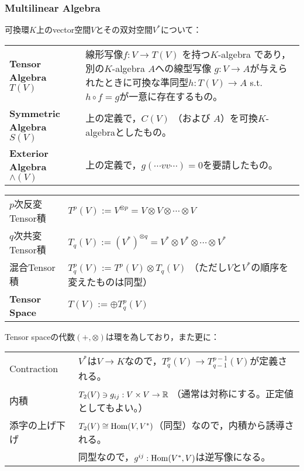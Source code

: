 \subsubsection{Multilinear Algebra}
可換環$K$上のvector空間$V$とその双対空間$V^*$について：\vspace{.6zw}\par
\begin{tabular}{l@{ :\ \ \ }l}
{\bf Tensor Algebra} $T(V)$
    & \begin{minipage}[t]{280pt}
       線形写像$f: V\to T(V)$ を持つ$K$-algebra であり，別の$K$-algebra $A$への線型写像 $g: V\to A$が与えられたときに可換な準同型$h:T(V)\to A$ s.t. $h\circ f=g$が一意に存在するもの。
      \end{minipage}\vspace{.5zw}\\
{\bf Symmetric Algebra} $S(V)$
    & 上の定義で，$C(V)$ （および $A$）を可換$K$-algebraとしたもの。\\
{\bf Exterior Algebra} $\wedge(V)$
    & 上の定義で，$g(\cdots vv\cdots)=0$を要請したもの。
\end{tabular}

\vspace{1zw}

\begin{tabular}{l@{ :\ \ \ }l}
$p$次反変Tensor積 & $T^p(V):=V^{\otimes p} = V\otimes V\otimes \cdots \otimes V$\\
$q$次共変Tensor積 & $T_q(V):=(V^*)^{\otimes q} = V^*\otimes V^*\otimes \cdots \otimes V^*$\\
混合Tensor積      & $T^p_q(V):=T^p(V)\otimes T_q(V)$ （ただし$V$と$V^*$の順序を変えたものは同型）\\
{\bf Tensor Space}& $T(V):=\oplus T^p_q(V)$
\end{tabular}\vspace{.5zw}

Tensor spaceの代数$(+,\otimes)$は環を為しており，また更に：\vspace{.2zw}\par
\begin{tabular}{l@{ :\ \ \ }l}
Contraction    & $V^*$は$V\to K$なので，$T^p_q(V)\to T^{p-1}_{q-1}(V)$が定義される。\\
内積           & $T_2(V)\ni g_{ij}: V\times V\to \mathbb R$ （通常は対称にする。正定値としてもよい。）\\
添字の上げ下げ & $T_2(V)\cong\mathop{\mathrm{Hom}}(V,V^*)$（同型）なので，内積から誘導される。\\
               & 同型なので，$g^{ij}: \mathop{\mathrm{Hom}}(V^*,V)$は逆写像になる。
\end{tabular}


